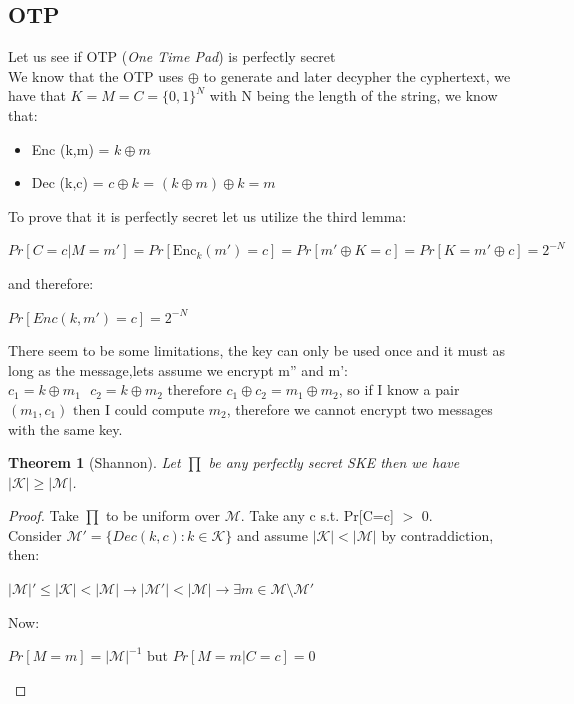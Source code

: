 \documentclass[11pt, a4paper]{article}
\newtheorem{thm}{Theorem}
\begin{document}
\subsection{OTP}
Let us see if OTP (\textit{One Time Pad}) is perfectly secret\\
We know that the OTP uses $\oplus$ to generate and later decypher the cyphertext, we have that $K=M=C=\{0,1\}^N$ with N being the length of the string, we know that:
\begin{itemize}
    \item Enc (k,m) = $k \oplus m$
    \item Dec (k,c) = $c \oplus k$ = $(k \oplus m) \oplus k = m$
\end{itemize}
To prove that it is perfectly secret let us utilize the third lemma:
\begin{center}
    $Pr[C=c | M=m'] = Pr[\text{Enc}_k (m') = c] = Pr[m' \oplus K = c] = Pr[K = m' \oplus c] = 2^{-N}$
\end{center}
and therefore:\\
\begin{center}
    $Pr[Enc(k,m') = c] = 2^{-N}$
\end{center}
There seem to be some limitations, the key can only be used once and it must as long as the message,lets assume we encrypt m'' and m':
$c_1 = k \oplus m_1\text{    } c_2 = k \oplus m_2 \text{ therefore } c_1 \oplus c_2 = m_1 \oplus m_2$, so if I know a pair $(m_1,c_1) \text{ then I could compute } m_2$, therefore we cannot encrypt two messages with the same key.
\begin{thm}[Shannon]
Let $\prod$ be any perfectly secret SKE then we have $|\mathcal{K}| \ge |\mathcal{M}|$.
\end{thm}
\begin{proof}
Take $\prod$ to be uniform over $\mathcal{M}$. Take any c s.t. Pr[C=c] $>$ 0.\\
Consider $\mathcal{M'} = \{Dec(k,c): k \in \mathcal{K}\}$ and assume $|\mathcal{K}| < |\mathcal{M}|$ by contraddiction, then:\\
\begin{center}
    $|\mathcal{M}|' \leq |\mathcal{K}| < |\mathcal{M}| \rightarrow |\mathcal{M'}| < |\mathcal{M}| \rightarrow \exists m \in \mathcal{M} \setminus \mathcal{M'}$
\end{center}
Now:\\
\begin{center}
   $ Pr[M=m] = |\mathcal{M}|^{-1} \text{ but } Pr[M=m | C=c] = 0 $
\end{center}

\end{proof}
\end{document}
